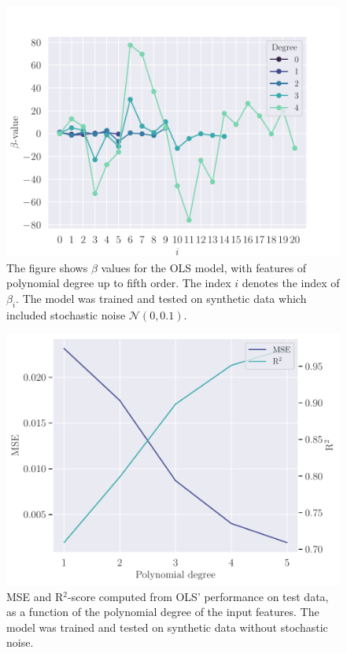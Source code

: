 \begin{figure}[h]
    \centering
    \includegraphics[width=\linewidth]{project-1/latex/figures/ols_beta_N50.pdf}
    \caption{The figure shows $\beta$ values for the OLS model, with features of polynomial degree up to fifth order. The index $i$ denotes the index of $\beta_{i}$. The model was trained and tested on synthetic data which included stochastic noise $\mathcal{N}(0, 0.1)$.}
    \label{fig:ols_beta}
\end{figure}
\begin{figure}[h]
    \centering
    \includegraphics[width=\linewidth]{project-1/latex/figures/ols_error_smooth_N50.pdf}
    \caption{MSE and R$^{2}$-score computed from OLS' performance on test data, as a function of the polynomial degree of the input features. The model was trained and tested on synthetic data without stochastic noise.}
    \label{fig:ols_error_smooth}
\end{figure}
